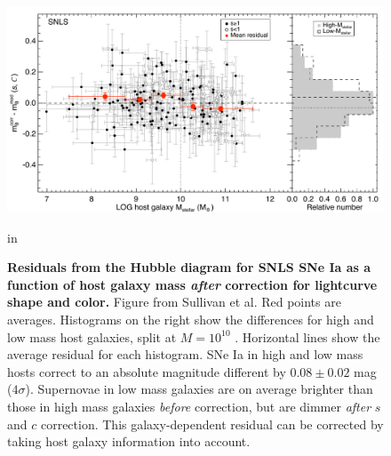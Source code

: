 \documentclass{nature1}
\begin{document}
\begin{figure}
\includegraphics[width=7in]{fig4a.pdf} 
\caption{\textsf{{\bf \textsf{Residuals from the Hubble diagram for SNLS SNe Ia as a
    function of host galaxy mass {\it after} correction for lightcurve
    shape and color.}}  Figure from Sullivan et
  al.\citep{2010MNRAS.406..782S} Red points are averages.  Histograms
  on the right show the differences for high and low mass host
  galaxies, split at $M=10^{10}$ \Msun .  Horizontal lines show the
  average residual for each histogram.  SNe Ia in high and low mass
  hosts correct to an absolute magnitude different by $0.08\pm 0.02$
  mag ($4\sigma $).  Supernovae in low mass galaxies are on average
  brighter than those in high mass galaxies {\it before} correction,
  but are dimmer {\it after} $s$ and $c$ correction.  This
  galaxy-dependent residual can be corrected by taking host galaxy
  information into account.}}
\label{sullivan}
 in
\end{figure}
\end{document}
